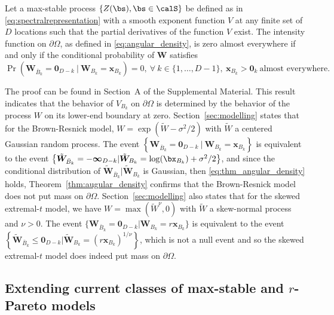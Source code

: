 \documentclass[12pt]{article}
\begin{document}
\begin{theorem}
\label{thm:augular_density}
Let a max-stable process $\{Z(\bs), \bs\in \calS\}$ be defined as in \eqref{eq:spectralrepresentation} with a smooth exponent function $V$ at any finite set of $D$ locations such that the partial derivatives of the function $V$ exist. 
The intensity function on $\partial\Omega$, as defined in \eqref{eq:angular_density}, is zero almost everywhere if and only if the conditional probability of $\bm W$ satisfies
%
\begin{equation}
\label{eq:thm_angular_density}
\Pr(\bm W_{\bar{B}_k}=\bm 0_{D-k} \ |\ \bm W_{B_k} = \bm x_{B_k} )=0,\ \forall\ k \in \{1,\ldots,D-1\},\ \bm x_{B_k}>\bm 0_k \ \text{almost everywhere. }
\end{equation}
%
\end{theorem}
%	
The proof 
can be found in Section~A of the Supplemental Material. This result indicates that the behavior of $V_{B_k}$ on $\partial\Omega$ is determined by the behavior of the process $W$ on its lower-end boundary at zero. Section~\ref{sec:modelling} states that for the Brown-Resnick model, 
$W=\exp \left(\tilde{W} - \sigma^2/2\right)$ with $\tilde W$ a centered Gaussian random process. The event $\left\{ \bm W_{\bar{B}_k}=\bm 0_{D-k} \ |\ \bm W_{B_k} = \bm x_{B_k} \right\}$ is  equivalent to the event $\left\{ \tilde{\bm W}_{\bar{B}_k} = -\bm\infty_{D-k} | \tilde{\bm W}_{B_k} = \log(\bx_{B_k}) + \sigma^2/2 \right\}$, and since the conditional distribution of $ \tilde{\bm W}_{\bar{B}_k} | \tilde{\bm W}_{B_k}$ is Gaussian, then \eqref{eq:thm_angular_density} holds, Theorem~\ref{thm:augular_density} confirms 
that the Brown-Resnick model does not put mass on $\partial\Omega$. Section~\ref{sec:modelling} also states that for the skewed extremal-$t$ model, we have $W=\max(\tilde W^\nu,0)$ with $\tilde W$ a skew-normal process and $\nu>0$. The event $\{\bm W_{\bar{B}_k} = \bm 0_{D-k} | \bm W_{B_k} = r \bm x_{B_k} \}$ is equivalent to the event $\left\{\tilde{\bm W}_{\bar{B}_k} \leq \bm 0_{D-k} | \tilde{\bm W}_{B_k} = (r \bm x_{B_k})^{1/\nu} \right\}$, which is not a null event and so the skewed extremal-$t$ model does indeed put mass on $\partial\Omega$.

\subsection{Extending current classes of max-stable and $r$-Pareto models}
\label{ssec:new_models}
\end{document}
